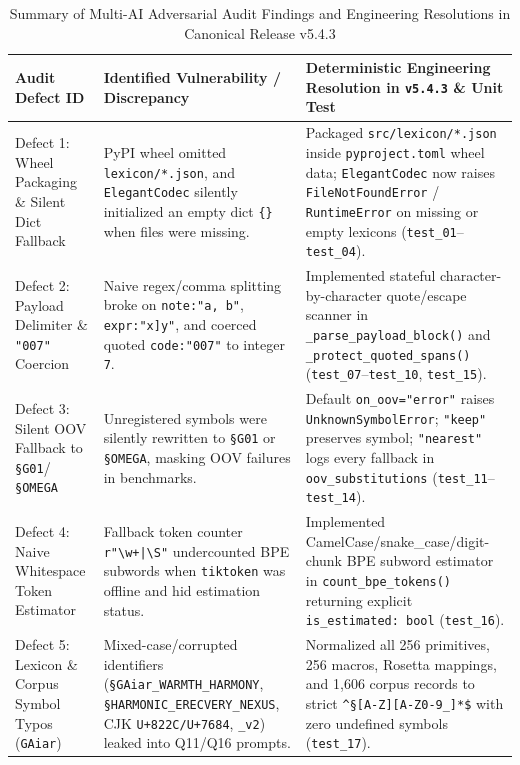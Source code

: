 \documentclass[9pt,a4paper]{extarticle}
\begin{document}
\begin{table}[h!]
\centering
\caption{Summary of Multi-AI Adversarial Audit Findings and Engineering Resolutions in Canonical Release v5.4.3}
\label{tab:adversarial_audit}
\footnotesize
\renewcommand{\arraystretch}{1.10}
\begin{tabularx}{\textwidth}{L{2.7cm} L{4.5cm} Y}
\toprule
{}
\textbf{\color{white}Audit Defect ID} &
\textbf{\color{white}Identified Vulnerability / Discrepancy} &
\textbf{\color{white}Deterministic Engineering Resolution in \texttt{v5.4.3} \& Unit Test} \\
\midrule
Defect 1: Wheel Packaging \& Silent Dict Fallback & PyPI wheel omitted \texttt{lexicon/*.json}, and \texttt{ElegantCodec} silently initialized an empty dict \texttt{\{\}} when files were missing. & Packaged \texttt{src/lexicon/*.json} inside \texttt{pyproject.toml} wheel data; \texttt{ElegantCodec} now raises \texttt{FileNotFoundError} / \texttt{RuntimeError} on missing or empty lexicons (\texttt{test\_01}--\texttt{test\_04}). \\
Defect 2: Payload Delimiter \& \texttt{"007"} Coercion & Naive regex/comma splitting broke on \texttt{note:"a, b"}, \texttt{expr:"x]y"}, and coerced quoted \texttt{code:"007"} to integer \texttt{7}. & Implemented stateful character-by-character quote/escape scanner in \texttt{\_parse\_\allowbreak payload\_\allowbreak block()} and \texttt{\_protect\_\allowbreak quoted\_\allowbreak spans()} (\texttt{test\_07}--\texttt{test\_10}, \texttt{test\_15}). \\
Defect 3: Silent OOV Fallback to \texttt{\S G01}/\texttt{\S OMEGA} & Unregistered symbols were silently rewritten to \texttt{\S G01} or \texttt{\S OMEGA}, masking OOV failures in benchmarks. & Default \texttt{on\_oov="error"} raises \texttt{UnknownSymbolError}; \texttt{"keep"} preserves symbol; \texttt{"nearest"} logs every fallback in \texttt{oov\_substitutions} (\texttt{test\_11}--\texttt{test\_14}). \\
Defect 4: Naive Whitespace Token Estimator & Fallback token counter \texttt{r"\textbackslash w+|\textbackslash S"} undercounted BPE subwords when \texttt{tiktoken} was offline and hid estimation status. & Implemented CamelCase/snake\_case/digit-chunk BPE subword estimator in \texttt{count\_bpe\_tokens()} returning explicit \texttt{is\_estimated: bool} (\texttt{test\_16}). \\
Defect 5: Lexicon \& Corpus Symbol Typos (\texttt{GAiar}) & Mixed-case/corrupted identifiers (\texttt{\S GAiar\_\allowbreak WARMTH\_\allowbreak HARMONY}, \texttt{\S HARMONIC\_\allowbreak ERECVERY\_\allowbreak NEXUS}, CJK \texttt{U+822C/U+7684}, \texttt{\_v2}) leaked into Q11/Q16 prompts. & Normalized all 256 primitives, 256 macros, Rosetta mappings, and 1,606 corpus records to strict \texttt{\^{}\S[A-Z][A-Z0-9\_]*\$} with zero undefined symbols (\texttt{test\_17}). \\

\end{tabularx}
\end{table}
\end{document}
